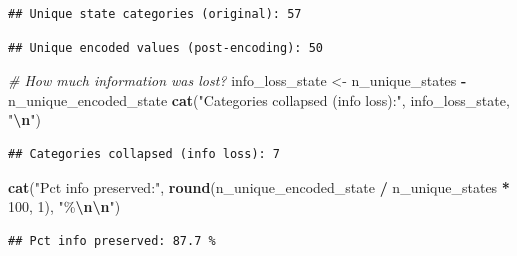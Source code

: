 \documentclass[
]{article}
\newenvironment{Shaded}{\begin{snugshade}}{\end{snugshade}}
\newcommand{\CommentTok}[1]{\textcolor[rgb]{0.56,0.35,0.01}{\textit{#1}}}
\newcommand{\DecValTok}[1]{\textcolor[rgb]{0.00,0.00,0.81}{#1}}
\newcommand{\FunctionTok}[1]{\textcolor[rgb]{0.13,0.29,0.53}{\textbf{#1}}}
\newcommand{\NormalTok}[1]{#1}
\newcommand{\OtherTok}[1]{\textcolor[rgb]{0.56,0.35,0.01}{#1}}
\newcommand{\SpecialCharTok}[1]{\textcolor[rgb]{0.81,0.36,0.00}{\textbf{#1}}}
\newcommand{\StringTok}[1]{\textcolor[rgb]{0.31,0.60,0.02}{#1}}
\begin{document}
\begin{verbatim}
## Unique state categories (original): 57
\end{verbatim}

\begin{Shaded}
\end{Shaded}

\begin{verbatim}
## Unique encoded values (post-encoding): 50
\end{verbatim}

\begin{Shaded}
\begin{Highlighting}[]
\CommentTok{\# How much information was lost?}
\NormalTok{info\_loss\_state }\OtherTok{\textless{}{-}}\NormalTok{ n\_unique\_states }\SpecialCharTok{{-}}\NormalTok{ n\_unique\_encoded\_state}
\FunctionTok{cat}\NormalTok{(}\StringTok{"Categories collapsed (info loss):"}\NormalTok{, info\_loss\_state, }\StringTok{"}\SpecialCharTok{\textbackslash{}n}\StringTok{"}\NormalTok{)}
\end{Highlighting}
\end{Shaded}

\begin{verbatim}
## Categories collapsed (info loss): 7
\end{verbatim}

\begin{Shaded}
\begin{Highlighting}[]
\FunctionTok{cat}\NormalTok{(}\StringTok{"Pct info preserved:"}\NormalTok{, }
    \FunctionTok{round}\NormalTok{(n\_unique\_encoded\_state }\SpecialCharTok{/}\NormalTok{ n\_unique\_states }\SpecialCharTok{*} \DecValTok{100}\NormalTok{, }\DecValTok{1}\NormalTok{), }\StringTok{"\%}\SpecialCharTok{\textbackslash{}n\textbackslash{}n}\StringTok{"}\NormalTok{)}
\end{Highlighting}
\end{Shaded}

\begin{verbatim}
## Pct info preserved: 87.7 %
\end{verbatim}
\end{document}
